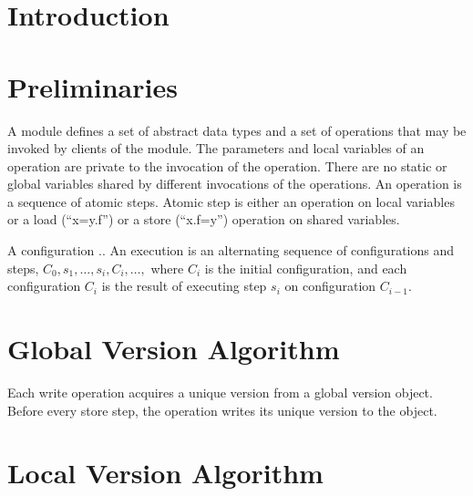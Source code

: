 \documentclass{article}
\newcommand{\code}[1]{\textsf{#1}}
\begin{document}
\maketitle

\section{Introduction}

\section{Preliminaries}
A module defines a set of abstract data types and a 
set of operations that may be invoked by
clients of the module. 
The parameters and local variables 
of an operation are private to the
invocation of the operation. 
There are no static or global variables shared by  
different invocations of the operations. 
An operation is a sequence of atomic steps. 
Atomic step is either an operation on local 
variables or a load (``\code{x=y.f}'') or 
a store (``\code{x.f=y}'') operation on shared variables.

A configuration .. 
An execution is an alternating sequence of 
configurations and steps,
$C_0,s_1,\ldots,s_i,C_i,\ldots,$ 
where $C_i$ is the initial configuration,
and each configuration $C_i$ is the result of
executing step $s_i$ on configuration $C_{i-1}$.

\section{Global Version Algorithm}
Each write operation acquires a unique version 
from a global version object. Before every store step,  
the operation writes its unique version to the object.
 

\section{Local Version Algorithm} 
 
\end{document}
